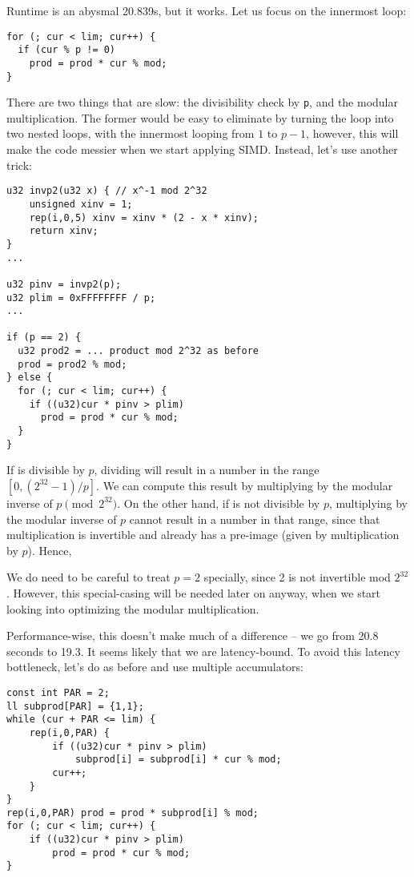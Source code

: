 \documentclass[openany]{book}
\begin{document}
Runtime is an abysmal 20.839s, but it works.
Let us focus on the innermost loop:
\begin{lstlisting}
for (; cur < lim; cur++) {
  if (cur % p != 0)
    prod = prod * cur % mod;
}
\end{lstlisting}

There are two things that are slow: the divisibility check by \texttt{p}, and the modular multiplication.
The former would be easy to eliminate by turning the loop into two nested loops, with the innermost looping from $1$ to $p-1$, however, this will make the code messier when we start applying SIMD.
Instead, let's use another trick:

\begin{lstlisting}
u32 invp2(u32 x) { // x^-1 mod 2^32
	unsigned xinv = 1;
	rep(i,0,5) xinv = xinv * (2 - x * xinv);
	return xinv;
}
...

u32 pinv = invp2(p);
u32 plim = 0xFFFFFFFF / p;
...

if (p == 2) {
  u32 prod2 = ... product mod 2^32 as before
  prod = prod2 % mod;
} else {
  for (; cur < lim; cur++) {
    if ((u32)cur * pinv > plim)
      prod = prod * cur % mod;
  }
}
\end{lstlisting}

If \verb@cur@ is divisible by $p$, dividing will result in a number in the range $[0, (2^{32}-1) / p]$.
We can compute this result by multiplying by the modular inverse of $p \pmod{2^{32}}$.
On the other hand, if \verb@cur@ is not divisible by $p$, multiplying by the modular inverse of $p$ cannot result in a number in that range, since that multiplication is invertible and already has a pre-image (given by multiplication by $p$).
Hence, \verb@cur % p == 0@ can be replaced by \verb@(u32)cur * pinv <= plim@, multiplication being a much cheaper operation than modulo.

We do need to be careful to treat $p = 2$ specially, since 2 is not invertible mod $2^{32}$.
However, this special-casing will be needed later on anyway, when we start looking into optimizing the modular multiplication.

Performance-wise, this doesn't make much of a difference -- we go from 20.8 seconds to 19.3.
It seems likely that we are latency-bound.
To avoid this latency bottleneck, let's do as before and use multiple accumulators:

\begin{lstlisting}
const int PAR = 2;
ll subprod[PAR] = {1,1};
while (cur + PAR <= lim) {
	rep(i,0,PAR) {
		if ((u32)cur * pinv > plim)
			subprod[i] = subprod[i] * cur % mod;
		cur++;
	}
}
rep(i,0,PAR) prod = prod * subprod[i] % mod;
for (; cur < lim; cur++) {
	if ((u32)cur * pinv > plim)
		prod = prod * cur % mod;
}
\end{lstlisting}
\end{document}
